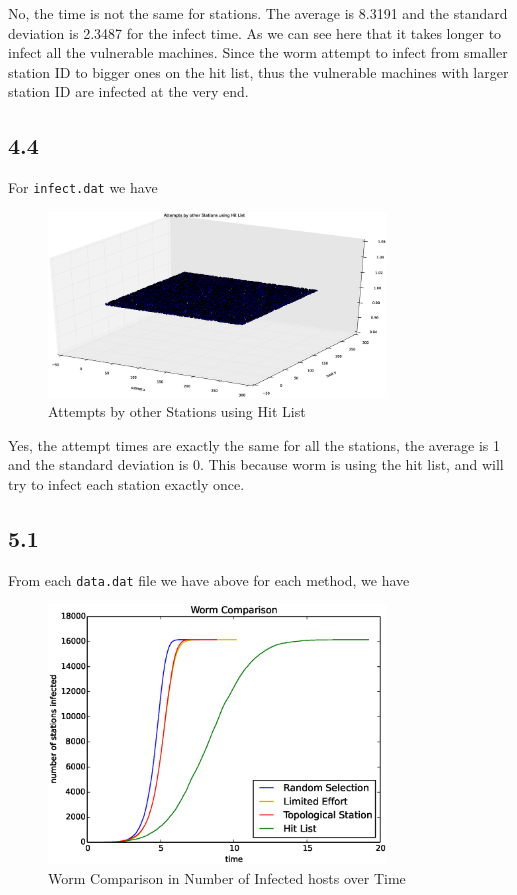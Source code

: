 \documentclass[10pt]{article}
\begin{document}
No, the time is not the same for stations. The average is 8.3191 and the standard deviation is 2.3487 for the infect time. As we can see here that it takes longer to infect all the vulnerable machines. Since the worm attempt to infect from smaller station ID to bigger ones on the hit list, thus the vulnerable machines with larger station ID are infected at the very end.

\subsection*{4.4}
For \texttt{infect.dat} we have

\begin{figure}[H]
\begin{center}
\includegraphics[width=0.8\textwidth]{figure4.4.eps}
\caption{Attempts by other Stations using Hit List}
\end{center}
\end{figure}

Yes, the attempt times are exactly the same for all the stations, the average is 1 and the standard deviation is 0. This because worm is using the hit list, and will try to infect each station exactly once.


\subsection*{5.1}

From each \texttt{data.dat} file we have above for each method, we have

\begin{figure}[H]
\begin{center}
\includegraphics[width=0.8\textwidth]{figure5.1.eps}
\caption{Worm Comparison in Number of Infected hosts over Time}
\end{center}
\end{figure}
\end{document}
